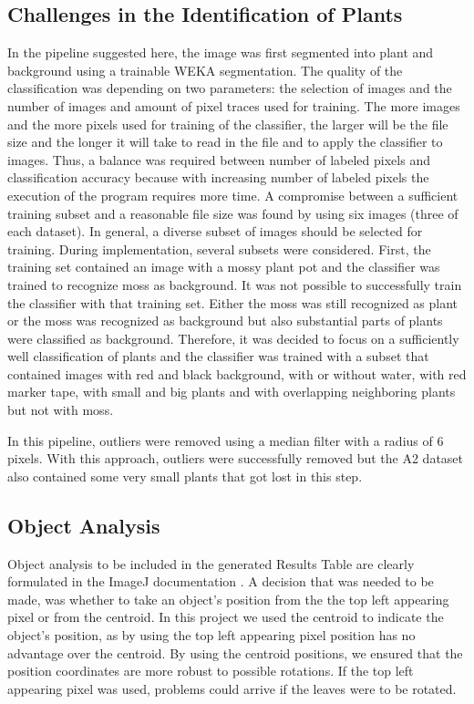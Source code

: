 \documentclass[paper=A4,bibliography=totocnumbered]{scrartcl}
\begin{document}
\subsection{Challenges in the Identification of Plants}
In the pipeline suggested here, the image was first segmented into plant and background using a trainable WEKA segmentation. The quality of the classification was depending on two parameters: the selection of images and the number of images and amount of pixel traces used for training. The more images and the more pixels used for training of the classifier, the larger will be the file size and the longer it will take to read in the file and to apply the classifier to images. Thus, a balance was required between number of labeled pixels and classification accuracy because with increasing number of labeled pixels the execution of the program requires more time. A compromise between a sufficient training subset and a reasonable file size was found by using six images (three of each dataset). In general, a diverse subset of images should be selected for training. During implementation, several subsets were considered. First, the training set contained an image with a mossy plant pot and the classifier was trained to recognize moss as background. It was not possible to successfully train the classifier with that training set. Either the moss was still recognized as plant or the moss was recognized as background but also substantial parts of plants were classified as background. Therefore, it was decided to focus on a sufficiently well classification of plants and the classifier was trained with a subset that contained images with red and black background, with or without water, with red marker tape, with small and big plants and with overlapping neighboring plants but not with moss.

In this pipeline, outliers were removed using a median filter with a radius of 6 pixels. With this approach, outliers were successfully removed but the A2 dataset also contained some very small plants that got lost in this step. 

\subsection{Object Analysis}
Object analysis to be included in the generated Results Table are clearly formulated in the ImageJ documentation \citep{Ferreira.2012}. A decision that was needed to be made, was whether to take an object's position from the the top left appearing pixel or from the centroid. In this project we used the centroid to indicate the object's position, as by using the top left appearing pixel position has no advantage over the centroid. By using the centroid positions, we ensured that the position coordinates are more robust to possible rotations. If the top left appearing pixel was used, problems could arrive if the leaves were to be rotated. 
\end{document}
